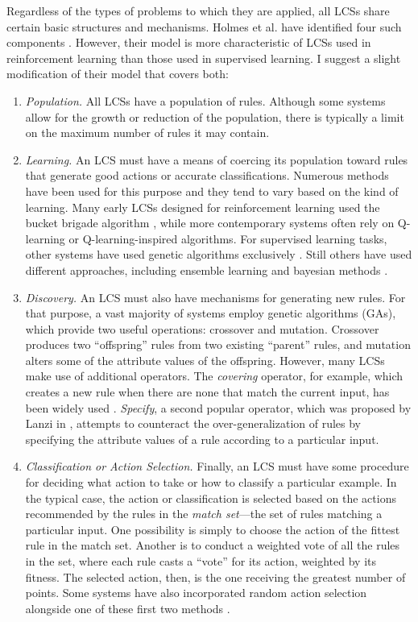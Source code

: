 \documentclass[11pt]{article}
\begin{document}
Regardless of the types of problems to which they are applied, all LCSs share certain basic structures and mechanisms. Holmes et al. have identified four such components  \cite{holmes_learning_2002}. However, their model is more characteristic of LCSs used in reinforcement learning than those used in supervised learning. I suggest a slight modification of their model that covers both:
\begin{enumerate}
\item \emph{Population.} All LCSs have a population of rules. Although some systems allow for the growth or reduction of the population, there is typically a limit on the maximum number of rules it may contain.
\item \emph{Learning.} An LCS must have a means of coercing its population toward rules that generate good actions or accurate classifications. Numerous methods have been used for this purpose and they tend to vary based on the kind of learning. Many early LCSs designed for reinforcement learning used the bucket brigade algorithm \cite{holland_properties_1985}, while more contemporary systems often rely on Q-learning \cite{c._j._c._h._learning_1989, orriols-puig_fuzzy-ucs:_2009} or Q-learning-inspired algorithms. For supervised learning tasks, other systems have used genetic algorithms exclusively \cite{llora_towards_2007}. Still others have used different approaches, including ensemble learning \cite{gao_learning_2005} and bayesian methods \cite{hai_h._dam_bcs:_2006}.
\item \emph{Discovery.} An LCS must also have mechanisms for generating new rules. For that purpose, a vast majority of systems employ genetic algorithms (GAs), which provide two useful operations: crossover and mutation. Crossover produces two ``offspring'' rules from two existing ``parent'' rules, and mutation alters some of the attribute values of the offspring. However, many LCSs make use of additional operators. The \emph{covering} operator, for example, which creates a new rule when there are none that match the current input, has been widely used \cite{orriols-puig_fuzzy-ucs:_2009, wilson_classifier_1995, bernado-mansilla_accuracy-based_2003}. \emph{Specify}, a second popular operator, which was proposed by Lanzi in \cite{lanzi_study_1997},  attempts to counteract the over-generalization of rules by specifying the attribute values of a rule according to a particular input. 
\item \emph{Classification or Action Selection.} Finally, an LCS must have some procedure for deciding what action to take or how to classify a particular example. In the typical case, the action or classification is selected based on the actions recommended by the rules in the \emph{match set}---the set of rules matching a particular input. One possibility is simply to choose the action of the fittest rule in the match set. Another is to conduct a weighted vote of all the rules in the set, where each rule casts a ``vote'' for its action, weighted by its fitness. The selected action, then, is the one receiving the greatest number of points. Some systems have also incorporated random action selection alongside one of these first two methods \cite{wilson_classifier_1995}.
\end{enumerate}
\end{document}
